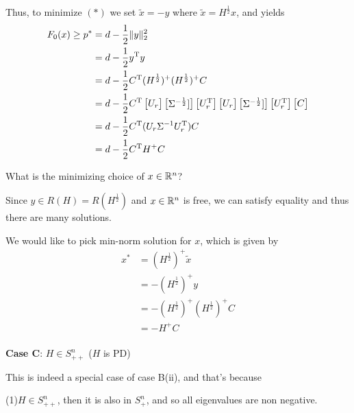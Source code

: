 Thus, to minimize $(*)$ we set $\tilde{x} = -y$ where $\tilde{x} = H^{\frac{1}{2}}x$, and yields
\begin{align*}
F_0(x) \geq p^* &= d - \frac{1}{2}\Vert y \Vert_2^2\\
&= d - \frac{1}{2}y^{{\rm T}}y\\
&= d - \frac{1}{2}C^{{\rm T}}(H^{\frac{1}{2}})^+(H^{\frac{1}{2}})^+C\\
&= d - \frac{1}{2}C^{{\rm T}}
\begin{bmatrix}
U_r
\end{bmatrix}
\begin{bmatrix}
\Sigma^{-\frac{1}{2}}]
\end{bmatrix}
\begin{bmatrix}
U_r^{{\rm T}}
\end{bmatrix}
\begin{bmatrix}
U_r
\end{bmatrix}
\begin{bmatrix}
\Sigma^{-\frac{1}{2}}]
\end{bmatrix}
\begin{bmatrix}
U_r^{{\rm T}}
\end{bmatrix}
\begin{bmatrix}
C
\end{bmatrix}\\
&= d - \frac{1}{2}C^{{\rm T}}(U_r\Sigma^{-1}U^{{\rm T}}_r)C\\
&= d - \frac{1}{2}C^{{\rm T}}H^+C
\end{align*}

What is the minimizing choice of $x\in \mathbb{R}^n$?

Since $y\in R(H) = R(H^{\frac{1}{2}})$ and $x\in \mathbb{R}^n$ is free, we can satisfy equality and thus there are many solutions. 

We would like to pick min-norm solution for $x$, which is given by
\begin{align*}
x^* 
&= (H^{\frac{1}{2}})^+\tilde{x}\\
&= -(H^{\frac{1}{2}})^+y\\
&= -(H^{\frac{1}{2}})^+(H^{\frac{1}{2}})^+C\\
&= -H^+C
\end{align*}\\

\vspace{0.3cm}
\textbf{Case C}: $H\in S^n_{++}$ ($H$ is PD)

This is indeed a special case of case B(ii), and that's because

(1)$H\in S^n_{++}$, then it is also in $S^n_{+}$, and so all eigenvalues are non negative.

